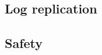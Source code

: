\documentclass[10pt,a4paper]{article}
\begin{document}
	\subsection{Log replication}


	\subsection{Safety}
\end{document}
